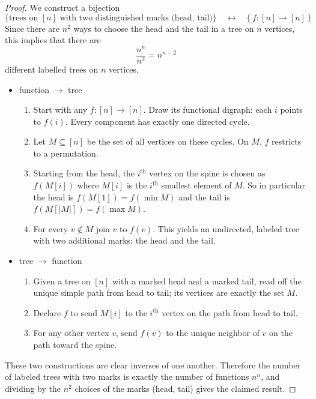 \begin{proof}
We construct a bijection
\[
  \bigl\{\text{trees on }[n]\text{ with two distinguished marks (head, tail)}\bigr\}
  \quad\longleftrightarrow\quad
  \bigl\{\,f\colon[n]\to[n]\,\bigr\}
\]
Since there are \(n^2\) ways to choose the head and the tail in a tree on \(n\) vertices, this implies that there are 
\[
\frac{n^n}{n^2} = n^{n-2}
\]
different labelled trees on \(n\) vertices.
\begin{itemize}
\item function \(\to\) tree
\begin{enumerate}[label=(\alph*)]
  \item 
  Start with any \(f:[n]\to[n]\).
  Draw its functional digraph: each \(i\) points to \(f(i)\).
  Every component has exactly one directed cycle.
  \item 
  Let \(M\subseteq[n]\) be the set of all vertices on these cycles.  
  On \(M\), \(f\) restricts to a permutation.
  \item
  Starting from the head, the \(i^\text{th}\) vertex on the spine is chosen as \(f(M[i])\) where \(M[i]\) is the \(i^\text{th}\) smallest element of \(M\).
  So in particular the head is \(f(M[1]) = f(\min M)\) and the tail is \(f(M[|M|]) = f(\max M)\).
  \item 
  For every \(v\notin M\) join \(v\) to \(f(v)\). This yields an undirected, labeled tree with two additional marks: the head and the tail.
\end{enumerate}
\item tree \(\to\) function
\begin{enumerate}[label=(\alph*)]
  \item Given a tree on \([n]\) with a marked head and a marked tail, read off the unique simple path from head to tail; its vertices are exactly the set \(M\).
  \item Declare \(f\) to send \(M[i]\) to the \(i^\text{th}\) vertex on the path from head to tail.
  \item For any other vertex \(v\), send \(f(v)\) to the unique neighbor of \(v\) on the path toward the spine.
\end{enumerate}
\end{itemize}
These two constructions are clear inverses of one another.  
Therefore the number of labeled trees with two marks is exactly the number of functions \(n^n\), and dividing by the \(n^2\) choices of the marks (head, tail) gives the claimed result.
\end{proof}


